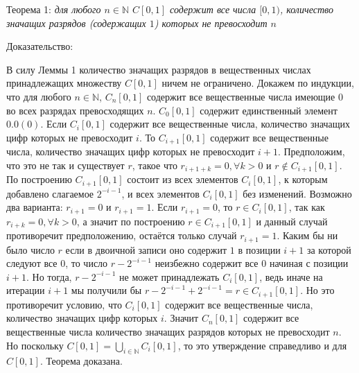 \documentclass[12pt]{article}
\begin{document}
Теорема 1: {\sl для любого $n \in \mathbb{N}$ $C[0, 1]$ содержит все числа $[0, 1)$, количество значащих разрядов (содержащих $1$) которых не превосходит $n$}

Доказательство:

В силу Леммы 1 количество значащих разрядов в вещественных числах принадлежащих множеству $C[0, 1]$ ничем не ограничено. Докажем по индукции, что для любого $n \in \mathbb{N}$, $C_n[0, 1]$ содержит все вещественные числа имеющие $0$ во всех разрядах превосходящих $n$. $C_0[0, 1]$ содержит единственный элемент $0.0(0)$. Если $C_i[0, 1]$ содержит все вещественные числа, количество значащих цифр которых не превосходит $i$. То $C_{i + 1}[0, 1]$ содержит все вещественные числа, количество значащих цифр которых не превосходит $i + 1$. Предположим, что это не так и существует $r$, такое что $r_{i + 1 + k} = 0,  \forall k > 0$ и $r \notin C_{i + 1}[0, 1]$. По построению $C_{i + 1}[0, 1]$ состоит из всех элементов $C_i[0, 1]$, к которым добавлено слагаемое $2^{- i - 1}$, и всех элементов $C_i[0, 1]$ без изменений. Возможно два варианта: $r_{i + 1} = 0$ и $r_{i + 1} = 1$. Если $r_{i + 1} = 0$, то $r \in C_i[0, 1]$, так как $r_{i + k} = 0,  \forall k > 0$, а значит по построению $r \in C_{i + 1}[0, 1]$ и данный случай противоречит предположению, остаётся только случай $r_{i + 1} = 1$. Каким бы ни было число $r$ если в двоичной записи оно содержит $1$ в позиции $i + 1$ за которой следуют все $0$, то число $r - 2^{- i - 1}$ неизбежно содержит все $0$ начиная с позиции $i + 1$. Но тогда, $r - 2^{- i - 1}$ не может принадлежать $C_i[0, 1]$, ведь иначе на итерации $i + 1$ мы получили бы $r - 2^{- i - 1} + 2^{- i - 1} = r \in C_{i + 1}[0, 1]$. Но это противоречит условию, что $C_i[0, 1]$ содержит все вещественные числа, количество значащих цифр которых $i$. Значит $C_n[0, 1]$ содержит все вещественные числа количество значащих разрядов которых не превосходит $n$. Но поскольку $C[0, 1] = \bigcup\limits_{i \in \mathbb{N}} C_i[0, 1]$, то это утверждение справедливо и для $C[0, 1]$. Теорема доказана.
\end{document}
